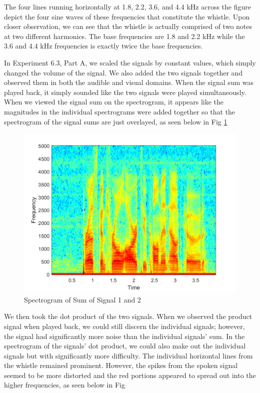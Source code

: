 \documentclass[10pt]{article}
\begin{document}
The four lines running horizontally at 1.8, 2.2, 3.6, and 4.4 kHz across the figure depict the four sine waves of these frequencies that constitute the whistle. 
Upon closer observation, we can see that the whistle is actually comprised of two notes at two different harmonics. The base frequencies are 1.8 and 2.2 kHz while the 3.6 and 4.4 kHz frequencies is exactly twice the base frequencies. 

In Experiment 6.3, Part A, we scaled the signals by constant values, which simply changed the volume of the signal. We also added the two signals together and observed them in both the audible and visual domains. When the signal sum was played back, it simply sounded like the two signals were played simultaneously. When we viewed the signal sum on the spectrogram, it appears like the magnitudes in the individual spectrograms were added together so that the spectrogram of the signal sums are just overlayed, as seen below in Fig \ref{fig:sum}

\begin{centering}
	\begin{figure} [H]
		\centering
		\includegraphics[scale=0.22]{images/combospecgram.png}
		\caption{Spectrogram of Sum of Signal 1 and 2}
		\label{fig:sum}
	\end{figure}
\end{centering}

We then took the dot product of the two signals. When we observed the product signal when played back, we could still discern the individual signals; however, the signal had significantly more noise than the individual signals' sum. In the spectrogram of the signals' dot product, we could also make out the individual signals but with significantly more difficulty. The individual horizontal lines from the whistle remained prominent. However, the spikes from the spoken signal seemed to be more distorted and the red portions appeared to spread out into the higher frequencies, as seen below in Fig
\end{document}
